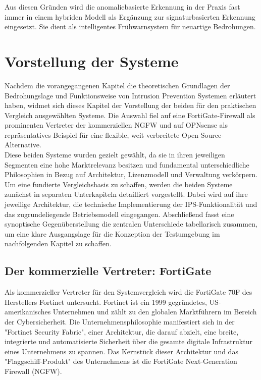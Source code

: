 Aus diesen Gründen wird die anomaliebasierte Erkennung in der Praxis fast immer in einem hybriden Modell als Ergänzung zur signaturbasierten Erkennung eingesetzt. Sie dient als intelligentes Frühwarnsystem für neuartige Bedrohungen.
\newpage
\section{Vorstellung der Systeme}
Nachdem die vorangegangenen Kapitel die theoretischen Grundlagen der Bedrohungslage und Funktionsweise von Intrusion Prevention Systemen erläutert haben, widmet sich dieses Kapitel der Vorstellung der beiden für den praktischen Vergleich ausgewählten Systeme. Die Auswahl fiel auf eine FortiGate-Firewall als prominenten Vertreter der kommerziellen NGFW und auf OPNsense als repräsentatives Beispiel für eine flexible, weit verbreitete Open-Source-Alternative.\\

Diese beiden Systeme wurden gezielt gewählt, da sie in ihren jeweiligen Segmenten eine hohe Marktrelevanz besitzen und fundamental unterschiedliche Philosophien in Bezug auf Architektur, Lizenzmodell und Verwaltung verkörpern. Um eine fundierte Vergleichsbasis zu schaffen, werden die beiden Systeme zunächst in separaten Unterkapiteln detailliert vorgestellt. Dabei wird auf ihre jeweilige Architektur, die technische Implementierung der IPS-Funktionalität und das zugrundeliegende Betriebsmodell eingegangen. Abschließend fasst eine synoptische Gegenüberstellung die zentralen Unterschiede tabellarisch zusammen, um eine klare Ausgangslage für die Konzeption der Testumgebung im nachfolgenden Kapitel zu schaffen.

\subsection{Der kommerzielle Vertreter: FortiGate}
Als kommerzieller Vertreter für den Systemvergleich wird die FortiGate 70F des Herstellers Fortinet untersucht. Fortinet ist ein 1999 gegründetes, US-amerikanisches Unternehmen und zählt zu den globalen Marktführern im Bereich der Cybersicherheit. Die Unternehmensphilosophie manifestiert sich in der "Fortinet Security Fabric", einer Architektur, die darauf abzielt, eine breite, integrierte und automatisierte Sicherheit über die gesamte digitale Infrastruktur eines Unternehmens zu spannen. Das Kernstück dieser Architektur und das "Flaggschiff-Produkt" des Unternehmens ist die FortiGate Next-Generation Firewall (NGFW).\\\\


